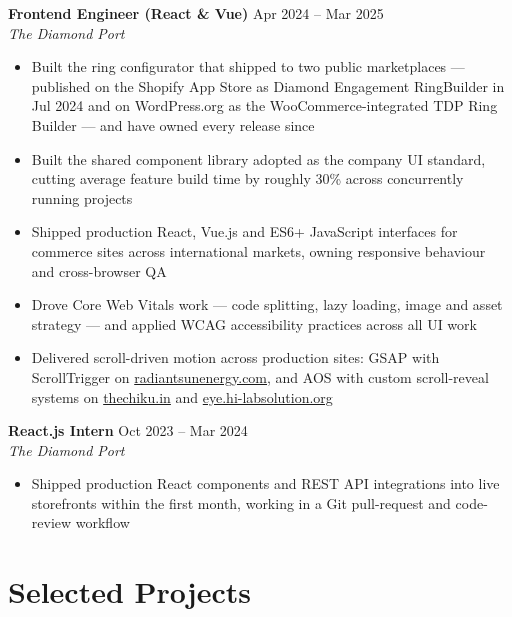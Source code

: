 \documentclass[10pt]{article}
\begin{document}
\textbf{Frontend Engineer (React \& Vue)} \hfill Apr 2024 -- Mar 2025 \\
\textit{The Diamond Port}
\begin{itemize}
  \item Built the ring configurator that shipped to two public marketplaces --- published on the Shopify App Store as Diamond Engagement RingBuilder in Jul 2024 and on WordPress.org as the WooCommerce-integrated TDP Ring Builder --- and have owned every release since
  \item Built the shared component library adopted as the company UI standard, cutting average feature build time by roughly 30\% across concurrently running projects
  \item Shipped production React, Vue.js and ES6+ JavaScript interfaces for commerce sites across international markets, owning responsive behaviour and cross-browser QA
  \item Drove Core Web Vitals work --- code splitting, lazy loading, image and asset strategy --- and applied WCAG accessibility practices across all UI work
  \item Delivered scroll-driven motion across production sites: GSAP with ScrollTrigger on \href{https://www.radiantsunenergy.com}{radiantsunenergy.com}, and AOS with custom scroll-reveal systems on \href{https://thechiku.in}{thechiku.in} and \href{https://eye.hi-labsolution.org}{eye.hi-labsolution.org}
\end{itemize}

\vspace{1pt}

\textbf{React.js Intern} \hfill Oct 2023 -- Mar 2024 \\
\textit{The Diamond Port}
\begin{itemize}
  \item Shipped production React components and REST API integrations into live storefronts within the first month, working in a Git pull-request and code-review workflow
\end{itemize}

\section*{Selected Projects}
\end{document}
